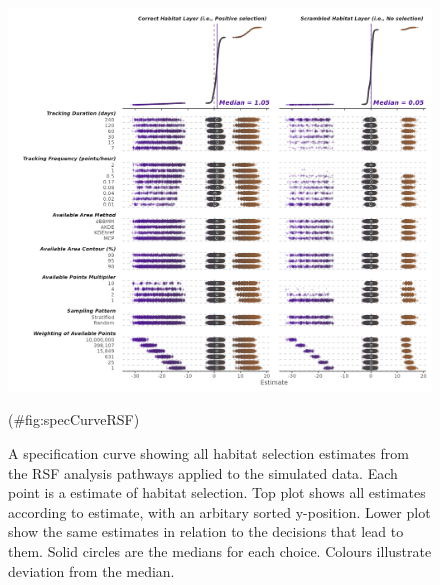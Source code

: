 \documentclass[10pt,a4paper]{article}
\begin{document}
\begin{figure}
\includegraphics[width=1\linewidth]{../figures/rsfSpecCurve} \caption{A specification curve showing all habitat selection estimates from the RSF analysis pathways applied to the simulated data. Each point is a estimate of habitat selection. Top plot shows all estimates according to estimate, with an arbitary sorted y-position. Lower plot show the same estimates in relation to the decisions that lead to them. Solid circles are the medians for each choice. Colours illustrate deviation from the median.}(\#fig:specCurveRSF)
\end{figure}
\end{document}
